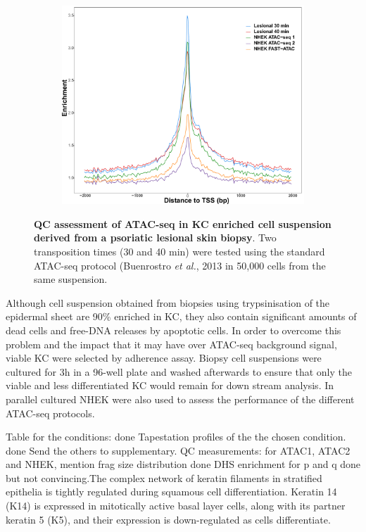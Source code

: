 \begin{figure}[htbp]
\begin{subfigure}{0.5\textwidth}
\includegraphics[width=\textwidth]{./Results1/pdfs/ATAC_skin_TSS_enrichment_PS02_30_40min_NHEK_ATAC1_ATAC_2_FAST_ATAC}
\caption{\textbf{}} %
\end{subfigure}%
\caption[QC assessment of ATAC-seq in KC enriched cell suspension derived from a psoriatic lesional skin biopsy]{\textbf{QC assessment of ATAC-seq in KC enriched cell suspension derived from a psoriatic lesional skin biopsy}. Two transposition times (30 and 40 min) were tested using the standard ATAC-seq protocol (Buenrostro \textit{et al.}, 2013 in 50,000 cells from the same suspension.}
\label{fig:PS02_skin_ATAC_QC_assessment}
\end{figure} 




Although cell suspension obtained from biopsies using trypsinisation of the epidermal sheet are 90\% enriched in KC, they also contain significant amounts of dead cells and free-DNA releases by apoptotic cells. In order to overcome this problem and the impact that it may have over ATAC-seq background signal, viable KC were selected by adherence assay. Biopsy cell suspensions were cultured for 3h in a 96-well plate and washed afterwards to ensure that only the viable and less differentiated KC would remain for down stream analysis. In parallel cultured NHEK were also used to assess the performance of the different ATAC-seq protocols.

Table for the conditions: done
Tapestation profiles of the the chosen condition. done Send the others to supplementary.
QC measurements: for ATAC1, ATAC2 and NHEK, mention frag size distribution done
DHS enrichment for p and q done but not convincing.The complex network of keratin filaments in stratified epithelia is tightly regulated during squamous cell differentiation. Keratin 14 (K14) is expressed in mitotically active basal layer cells, along with its partner keratin 5 (K5), and their expression is down-regulated as cells differentiate.


